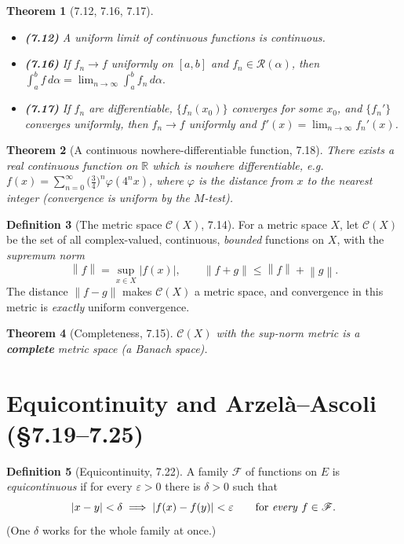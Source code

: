 \documentclass[11pt]{article}
\theoremstyle{definition}
\newtheorem{definition}{Definition}[section]
\theoremstyle{plain}
\newtheorem{theorem}[definition]{Theorem}
\newcommand{\R}{\mathbb{R}}
\newcommand{\CX}{\mathscr{C}}      %
\newcommand{\norm}[1]{\left\lVert #1 \right\rVert}
\newcommand{\abs}[1]{\left\lvert #1 \right\rvert}
\renewcommand{\to}{\longrightarrow}
\begin{document}
\begin{theorem}[7.12, 7.16, 7.17]\leavevmode
\begin{itemize}[leftmargin=1.6em, itemsep=1pt]
  \item \textbf{(7.12)} A uniform limit of continuous functions is continuous.
  \item \textbf{(7.16)} If $f_n\to f$ uniformly on $[a,b]$ and $f_n\in\mathscr{R}(\alpha)$, then
        $\displaystyle\int_a^b f\,d\alpha=\lim_{n\to\infty}\int_a^b f_n\,d\alpha.$
  \item \textbf{(7.17)} If $f_n$ are differentiable, $\{f_n(x_0)\}$ converges for some
        $x_0$, and $\{f_n'\}$ converges \emph{uniformly}, then $f_n\to f$ uniformly and
        $f'(x)=\displaystyle\lim_{n\to\infty} f_n'(x)$.
\end{itemize}
\end{theorem}

\begin{theorem}[A continuous nowhere-differentiable function, 7.18]
There exists a real continuous function on $\R$ which is nowhere differentiable,
e.g.\ $\displaystyle f(x)=\sum_{n=0}^{\infty}\Big(\tfrac{3}{4}\Big)^{n}\varphi(4^n x)$,
where $\varphi$ is the distance from $x$ to the nearest integer (convergence is
uniform by the $M$-test).
\end{theorem}

\begin{definition}[The metric space $\CX(X)$, 7.14]
For a metric space $X$, let $\CX(X)$ be the set of all complex-valued, continuous,
\emph{bounded} functions on $X$, with the \emph{supremum norm}
\[
   \norm{f}=\sup_{x\in X}\abs{f(x)},
   \qquad
   \norm{f+g}\le\norm{f}+\norm{g}.
\]
The distance $\norm{f-g}$ makes $\CX(X)$ a metric space, and convergence in this
metric is \emph{exactly} uniform convergence.
\end{definition}

\begin{theorem}[Completeness, 7.15]
$\CX(X)$ with the sup-norm metric is a \textbf{complete} metric space
(a Banach space).
\end{theorem}

\section{Equicontinuity and Arzel\`a--Ascoli (\S7.19--7.25)}

\begin{definition}[Equicontinuity, 7.22]
A family $\mathscr{F}$ of functions on $E$ is \emph{equicontinuous} if for every
$\varepsilon>0$ there is $\delta>0$ such that
\[
   \abs{x-y}<\delta \;\Longrightarrow\; \abs{f(x)-f(y)}<\varepsilon
   \qquad\text{for \emph{every} } f\in\mathscr{F}.
\]
(One $\delta$ works for the whole family at once.)
\end{definition}
\end{document}
